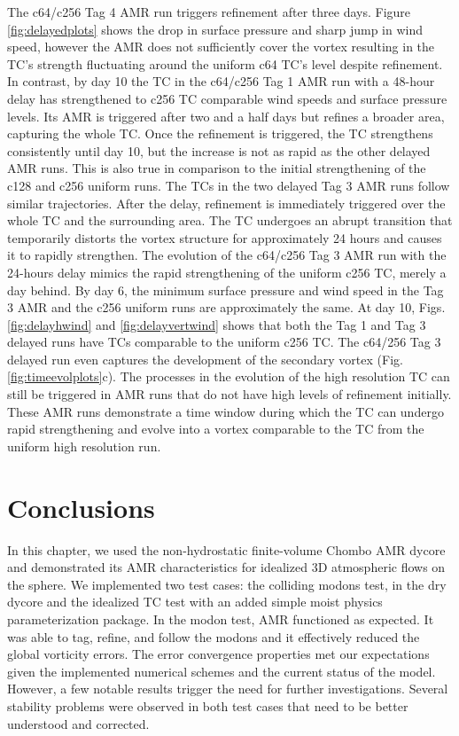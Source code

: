 The c64/c256 Tag 4 AMR run triggers refinement after three days. 
Figure \ref{fig:delayedplots} shows the drop in surface pressure and sharp 
jump in wind speed, however the AMR does not sufficiently cover the 
vortex resulting in the TC's strength fluctuating around the uniform c64 TC's level
despite refinement. In contrast, by day 10 the TC in the c64/c256 Tag 1 AMR 
run with a 48-hour delay has strengthened to c256 TC comparable wind speeds and surface pressure levels. Its
AMR is triggered after two and a half days but refines a broader area, capturing the whole TC. 
Once the refinement is triggered, the TC strengthens consistently until day 10, 
but the increase is not as rapid as the other delayed AMR runs.
This is also true in comparison to  the
initial strengthening of the c128 and c256 uniform runs. 
The TCs in the two delayed Tag 3 AMR runs follow similar trajectories.
After the delay, refinement is immediately triggered over the whole TC and the surrounding area. The 
TC undergoes an abrupt transition that temporarily distorts the vortex structure for approximately 24 hours and causes it to rapidly strengthen.
The evolution of the c64/c256 Tag 3 AMR run with the 24-hours delay mimics 
the rapid strengthening of the uniform c256 TC, merely a day behind.  By day 6, 
the minimum surface pressure and wind speed in the Tag 3 AMR 
and the c256 uniform runs are approximately the same.
At day 10, Figs. \ref{fig:delayhwind} and \ref{fig:delayvertwind} 
shows that both the Tag 1 and Tag 3 delayed
runs have TCs comparable to the uniform c256 TC. The c64/256 Tag 3 delayed run
even captures the development of the 
secondary vortex (Fig. \ref{fig:timeevolplots}c).
The processes in the evolution of the high resolution TC can still be 
triggered in AMR runs that do not have high levels of refinement initially.
These AMR runs demonstrate a time window during which the TC can undergo rapid strengthening
and evolve into a vortex comparable to the TC from the uniform high resolution run.

\section{Conclusions}
\label{sec:conclusion3}

In this chapter, we used the non-hydrostatic finite-volume Chombo AMR dycore
and demonstrated its AMR characteristics for idealized 3D atmospheric flows on the sphere.
 We implemented two test cases: the colliding modons
test, in the dry dycore and the idealized TC test with an added simple moist physics parameterization package.
In the modon test, AMR functioned as expected. It was able to tag, refine, and follow the modons
and it effectively reduced the global vorticity errors.
The error convergence properties met our expectations given 
the implemented numerical schemes and the current status of the model.
However, a few notable results trigger the need for further investigations.
Several stability problems were observed in both test cases that need to
be better understood and corrected.

